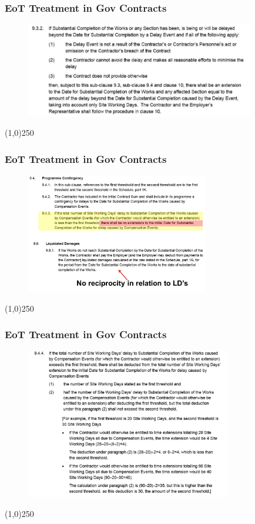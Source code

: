 \begin{frame}
\frametitle{EoT Treatment in Gov Contracts}
\begin{figure}
	\centering
		\includegraphics[width = 10cm]{images/delayevt.jpg}
	\label{fig:delayevt}
\end{figure}
\end{frame}
\begin{center}\line(1,0){250}\end{center}






\begin{frame}
\frametitle{EoT Treatment in Gov Contracts}
\begin{figure}
	\centering
		\includegraphics[width = 8cm]{images/eotDOF.jpg}
	\label{fig:eotDOF}
\end{figure}
\end{frame}
\begin{center}\line(1,0){250}\end{center}






\begin{frame}
\frametitle{EoT Treatment in Gov Contracts}
\begin{figure}
	\centering
		\includegraphics[width = 9cm]{images/eotDOF2.jpg}
	\label{fig:eotDOF2}
\end{figure}
\end{frame}
\begin{center}\line(1,0){250}\end{center}







